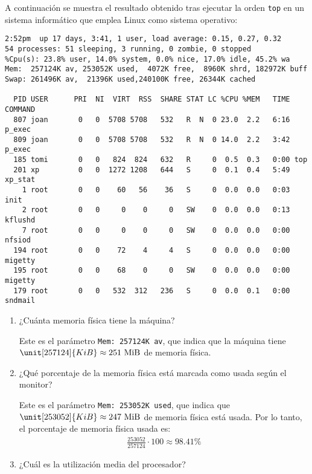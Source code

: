 \begin{ejercicio}
    A continuación se muestra el resultado obtenido tras ejecutar la orden \verb|top| en un sistema informático que emplea Linux como sistema operativo:
    \begin{verbatim}
2:52pm  up 17 days, 3:41, 1 user, load average: 0.15, 0.27, 0.32
54 processes: 51 sleeping, 3 running, 0 zombie, 0 stopped
%Cpu(s): 23.8% user, 14.0% system, 0.0% nice, 17.0% idle, 45.2% wa
Mem:  257124K av, 253052K used,  4072K free,  8960K shrd, 182972K buff
Swap: 261496K av,  21396K used,240100K free, 26344K cached

  PID USER      PRI  NI  VIRT  RSS  SHARE STAT LC %CPU %MEM   TIME COMMAND
  807 joan       0   0  5708 5708   532   R  N  0 23.0  2.2   6:16 p_exec
  809 joan       0   0  5708 5708   532   R  N  0 14.0  2.2   3:42 p_exec
  185 tomi       0   0   824  824   632   R     0  0.5  0.3   0:00 top
  201 xp         0   0  1272 1208   644   S     0  0.1  0.4   5:49 xp_stat
    1 root       0   0    60   56    36   S     0  0.0  0.0   0:03 init
    2 root       0   0     0    0     0   SW    0  0.0  0.0   0:13 kflushd
    7 root       0   0     0    0     0   SW    0  0.0  0.0   0:00 nfsiod
  194 root       0   0    72    4     4   S     0  0.0  0.0   0:00 migetty
  195 root       0   0    68    0     0   SW    0  0.0  0.0   0:00 migetty
  179 root       0   0   532  312   236   S     0  0.0  0.1   0:00 sndmail
    \end{verbatim}

    \begin{enumerate}
        \item ¿Cuánta memoria física tiene la máquina?
        
        Este es el parámetro \verb|Mem: 257124K av|, que indica que la máquina tiene $\unit[257124]{KiB}\approx 251\text{ MiB}$ de memoria física.
        \item ¿Qué porcentaje de la memoria física está marcada como usada según el monitor?
        
        Este es el parámetro \verb|Mem: 253052K used|, que indica que $\unit[253052]{KiB}\approx 247\text{ MiB}$ de memoria física está usada. Por lo tanto, el porcentaje de memoria física usada es:
        \begin{align*}
            \frac{253052}{257124} \cdot 100 \approx 98.41\%
        \end{align*}
        \item ¿Cuál es la utilización media del procesador?
        

\end{enumerate}
\end{ejercicio}
